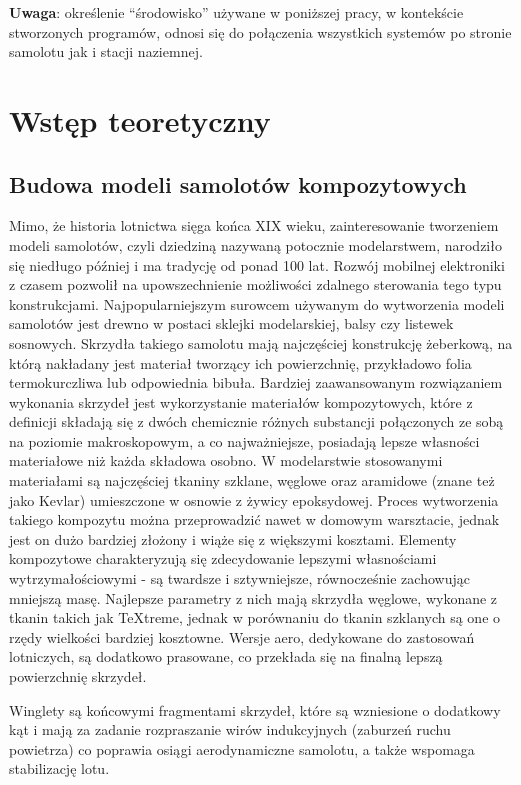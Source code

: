 \documentclass[12pt, a4paper]{article}
\begin{document}
\textbf{Uwaga}: określenie ``środowisko'' używane w poniższej pracy, w kontekście stworzonych programów, odnosi się do połączenia wszystkich systemów po stronie samolotu jak i stacji naziemnej.

\clearpage
\section{Wstęp teoretyczny}

\subsection{Budowa modeli samolotów kompozytowych}
Mimo, że historia lotnictwa sięga końca XIX wieku, zainteresowanie tworzeniem modeli samolotów, czyli dziedziną nazywaną potocznie modelarstwem, narodziło się niedługo później i ma tradycję od ponad 100 lat. Rozwój mobilnej elektroniki z czasem pozwolił na upowszechnienie możliwości zdalnego sterowania tego typu konstrukcjami. Najpopularniejszym surowcem używanym do wytworzenia modeli samolotów jest drewno w postaci sklejki modelarskiej, balsy czy listewek sosnowych. Skrzydła takiego samolotu mają najczęściej konstrukcję żeberkową, na którą nakładany jest materiał tworzący ich powierzchnię, przykładowo folia termokurczliwa lub odpowiednia bibuła. Bardziej zaawansowanym rozwiązaniem wykonania skrzydeł jest wykorzystanie materiałów kompozytowych, które z definicji składają się z dwóch chemicznie różnych substancji połączonych ze sobą na poziomie makroskopowym, a co najważniejsze, posiadają lepsze własności materiałowe niż każda składowa osobno. W modelarstwie stosowanymi materiałami są najczęściej tkaniny szklane, węglowe oraz aramidowe (znane też jako Kevlar) umieszczone w osnowie z żywicy epoksydowej. Proces wytworzenia takiego kompozytu można przeprowadzić nawet w domowym warsztacie, jednak jest on dużo bardziej złożony i wiąże się z większymi kosztami. Elementy kompozytowe charakteryzują się zdecydowanie lepszymi własnościami wytrzymałościowymi - są twardsze i sztywniejsze, równocześnie zachowując mniejszą masę. Najlepsze parametry z nich mają skrzydła węglowe, wykonane z tkanin takich jak TeXtreme, jednak w porównaniu do tkanin szklanych są one o rzędy wielkości bardziej kosztowne. Wersje aero, dedykowane do zastosowań lotniczych, są dodatkowo prasowane, co przekłada się na finalną lepszą powierzchnię skrzydeł. 

Winglety są końcowymi fragmentami skrzydeł, które są wzniesione o dodatkowy kąt i mają za zadanie rozpraszanie wirów indukcyjnych (zaburzeń ruchu powietrza) co poprawia osiągi aerodynamiczne samolotu, a także wspomaga stabilizację lotu.
\end{document}

